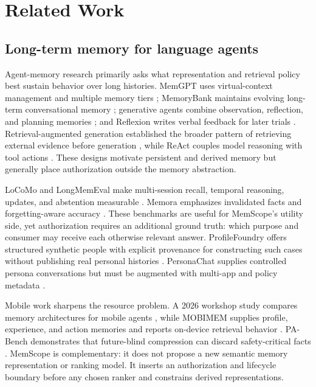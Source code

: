 \section{Related Work}
\label{sec:related}

\subsection{Long-term memory for language agents}

Agent-memory research primarily asks what representation and retrieval policy best sustain behavior over long histories. MemGPT uses virtual-context management and multiple memory tiers \citep{packer2023memgpt}; MemoryBank maintains evolving long-term conversational memory \citep{zhong2024memorybank}; generative agents combine observation, reflection, and planning memories \citep{park2023generativeagents}; and Reflexion writes verbal feedback for later trials \citep{shinn2023reflexion}. Retrieval-augmented generation established the broader pattern of retrieving external evidence before generation \citep{lewis2020rag}, while ReAct couples model reasoning with tool actions \citep{yao2023react}. These designs motivate persistent and derived memory but generally place authorization outside the memory abstraction.

LoCoMo and LongMemEval make multi-session recall, temporal reasoning, updates, and abstention measurable \citep{maharana2024locomo,wu2025longmemeval}. Memora emphasizes invalidated facts and forgetting-aware accuracy \citep{uddin2026memora}. These benchmarks are useful for MemScope's utility side, yet authorization requires an additional ground truth: which purpose and consumer may receive each otherwise relevant answer. ProfileFoundry offers structured synthetic people with explicit provenance for constructing such cases without publishing real personal histories \citep{selvam2026profilefoundry}. PersonaChat supplies controlled persona conversations but must be augmented with multi-app and policy metadata \citep{zhang2018personachat}.

Mobile work sharpens the resource problem. A 2026 workshop study compares memory architectures for mobile agents \citep{zhang2026mobilearchitectures}, while MOBIMEM supplies profile, experience, and action memories and reports on-device retrieval behavior \citep{liu2025mobimem}. PA-Bench demonstrates that future-blind compression can discard safety-critical facts \citep{zhu2026allergy}. MemScope is complementary: it does not propose a new semantic memory representation or ranking model. It inserts an authorization and lifecycle boundary before any chosen ranker and constrains derived representations.

